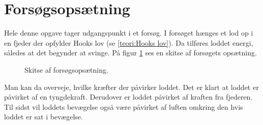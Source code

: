 \section{Forsøgsopsætning}
Hele denne opgave tager udgangspunkt i et forsøg.
I forsøget hænges et lod op i en fjeder der opfylder Hooks lov (se \ref{teori:Hooks lov}). 
Da tilføres loddet energi, således at det begynder at svinge. 
På figur \ref{fig:Basis Forsogsopsaetning} ses en skitse af forsøgets opsætning.

\begin{figure}[h]
\center
{}%

\caption{Skitse af forsøgsopsætning.}
\label{fig:Basis Forsogsopsaetning}
\end{figure} 
Man kan da overveje, hvilke kræfter der påvirker loddet. 
Det er klart at loddet er påvirket af en tyngdekraft. 
Derudover er loddet påvirket af kraften fra fjederen.
Til sidst vil loddets bevægelse også være påvirket af luften omkring den hvis loddet er sat i bevægelse. 

